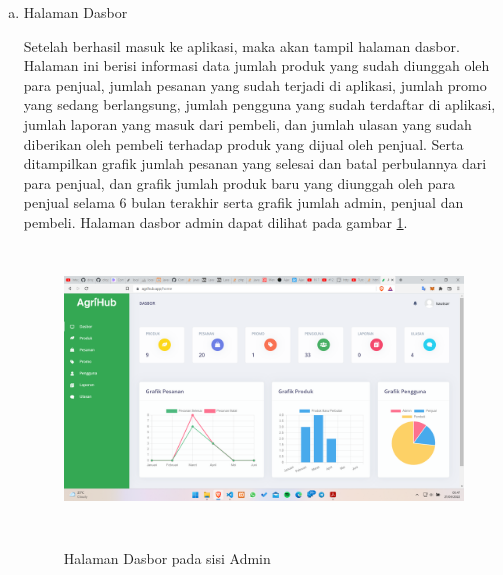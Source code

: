 \begin{enumerate}
\begin{enumerate}[a.]
		\item Halaman Dasbor
		\par Setelah berhasil masuk ke aplikasi, maka akan tampil halaman dasbor. Halaman ini berisi informasi data jumlah produk yang sudah diunggah oleh para penjual, jumlah pesanan yang sudah terjadi di aplikasi, jumlah promo yang sedang berlangsung, jumlah pengguna yang sudah terdaftar di aplikasi, jumlah laporan yang masuk dari pembeli, dan jumlah ulasan yang sudah diberikan oleh pembeli terhadap produk yang dijual oleh penjual. Serta ditampilkan grafik jumlah pesanan yang selesai dan batal perbulannya dari para penjual, dan grafik jumlah produk baru yang diunggah oleh para penjual selama 6 bulan terakhir serta grafik jumlah admin, penjual dan pembeli. Halaman dasbor admin dapat dilihat pada gambar \ref*{dashboard_admin}.
		\begin{figure}[H]
			\centering
			{\includegraphics [width = 13cm, height= 7.5cm]{gambar/admin/dashboard_admin}}
			\caption{Halaman Dasbor pada sisi Admin}
			\label{dashboard_admin}
		\end{figure}


\end{enumerate}
\end{enumerate}
